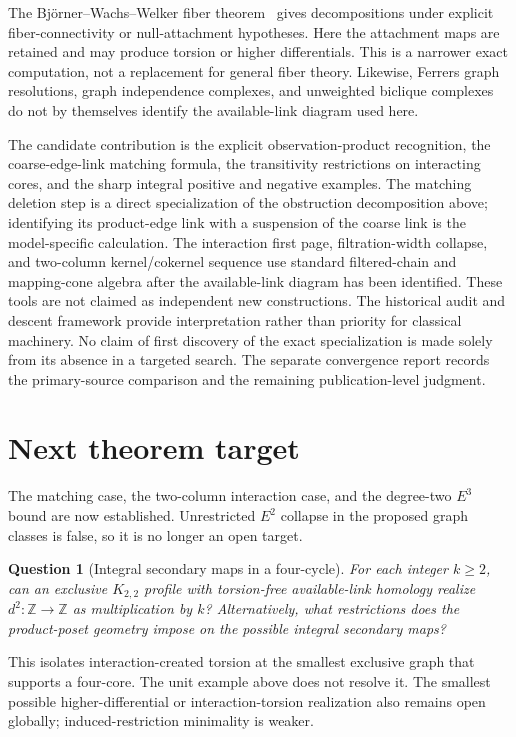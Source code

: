 \documentclass[11pt]{article}
\newtheorem{question}[theorem]{Question}
\begin{document}
The Bj\"orner--Wachs--Welker fiber theorem~\cite{BjornerWachsWelker2005}
gives decompositions under explicit fiber-connectivity or null-attachment
hypotheses.  Here the attachment maps are retained and may produce torsion
or higher differentials.  This is a narrower exact computation, not a
replacement for general fiber theory.  Likewise, Ferrers graph resolutions,
graph independence complexes, and unweighted biclique complexes do not by
themselves identify the available-link diagram used here.

The candidate contribution is the explicit observation-product recognition,
the coarse-edge-link matching formula, the transitivity restrictions on
interacting cores, and the sharp integral positive and negative examples.
The matching deletion step is a direct specialization of the obstruction
decomposition above; identifying its product-edge link with a suspension
of the coarse link is the model-specific calculation.  The interaction
first page, filtration-width collapse, and two-column kernel/cokernel
sequence use standard filtered-chain and mapping-cone algebra after the
available-link diagram has been identified.  These tools are not claimed
as independent new constructions.
The historical audit and descent framework provide interpretation rather
than priority for classical machinery.  No claim of first discovery of the
exact specialization is made solely from its absence in a targeted search.
The separate convergence report records the primary-source comparison and
the remaining publication-level judgment.

\section{Next theorem target}
The matching case, the two-column interaction case, and the degree-two
$E^3$ bound are now established.  Unrestricted $E^2$ collapse in the
proposed graph classes is false, so it is no longer an open target.

\begin{question}[Integral secondary maps in a four-cycle]
For each integer $k\ge2$, can an exclusive $K_{2,2}$ profile with
torsion-free available-link homology realize
$d^2:\mathbb Z\to\mathbb Z$ as multiplication by $k$?
Alternatively, what restrictions does the product-poset geometry impose
on the possible integral secondary maps?
\end{question}
This isolates interaction-created torsion at the smallest exclusive graph
that supports a four-core.  The unit example above does not resolve it.
The smallest possible higher-differential or interaction-torsion realization
also remains open globally; induced-restriction minimality is weaker.
\end{document}
